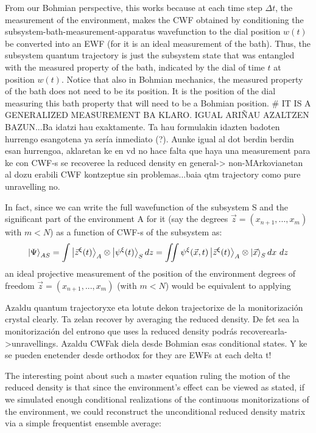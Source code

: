 \documentclass[11pt, a4paper]{article} %
\begin{document}
From our Bohmian perspective, this works because at each time step $\Delta t$, the measurement of the environment, makes the CWF obtained by conditioning the subsystem-bath-measurement-apparatus wavefunction to the dial position $w(t)$ be converted into an EWF (for it is an ideal measurement of the bath). Thus, the subsystem quantum trajectory is just the subsystem state that was entangled with the measured property of the bath, indicated by the dial of time $t$ at position $w(t)$. Notice that also in Bohmian mechanics, the measured property of the bath does not need to be its position. It is the position of the dial measuring this bath property that will need to be a Bohmian position. \# IT IS A GENERALIZED MEASUREMENT BA KLARO. IGUAL ARIÑAU AZALTZEN BAZUN...Ba idatzi hau exaktamente.
Ta hau formulakin idazten badoten hurrengo esangotena ya sería inmediato (?). Aunke igual al dot berdin berdin esan hurrengoa, aklaretan ke en vd no hace falta que haya una measurement para ke con CWF-s se recoveree la reduced density en general-> non-MArkovianetan al dozu erabili CWF kontzeptue sin problemas...baia qtm trajectory como pure unravelling no.

In fact, since we can write the full wavefunction of the subsystem S and the significant part of the environment A for it (say the degrees $\vec{z}=(x_{n+1},...,x_m)$ with $m<N$) as a function of CWF-s of the subsystem as:
\begin{equation}
\ket{\Psi}_{AS}=\int\ket{\vec{z}^\xi(t)}_A\otimes \ket{\psi^\xi(t)}_S dz = \iint\psi^\xi(\vec{x},t)\ket{\vec{z}^\xi(t)}_A\otimes \ket{\vec{x}}_S dx\ dz
\end{equation}
 an ideal projective measurement of the position of the environment degrees of freedom $\vec{z}=(x_{n+1},...,x_m)$ (with $m<N$) would be equivalent to applying 
 

Azaldu quantum trajectoryxe eta lotute dekon trajectorixe de la monitorización crystal clearly. Ta zelan recover by averaging the reduced density. De fet sea la monitorización del entrono que uses la reduced density podrás recoverearla->unravellings. Azaldu CWFak diela desde Bohmian esas conditional states. Y ke se pueden enetender desde orthodox for they are EWFs at each delta t!

The interesting point about such a master equation ruling the motion of the reduced density is that since the environment's effect can be viewed as stated, if we simulated enough conditional realizations of the continuous monitorizations of the environment, we could reconstruct the unconditional reduced density matrix via a simple frequentist ensemble average:
\end{document}
